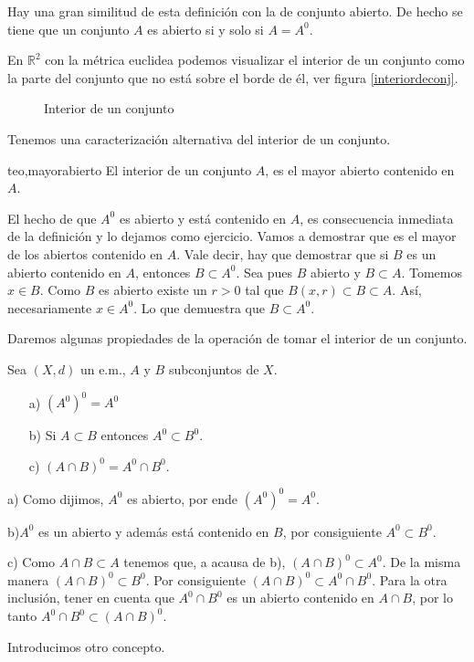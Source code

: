 Hay una gran similitud de esta definición con la de conjunto
abierto. De hecho se tiene que un conjunto $A$ es abierto si y
solo si $A=A^0$.

En $\mathbb{R}^2$ con la métrica euclidea podemos visualizar el
interior de un conjunto como la parte del conjunto que no está
sobre el borde de él, ver figura \vref{interiordeconj}.

\begin{figure}
\begin{center}
	\caption{Interior de un conjunto}\label{interiordeconj}
\end{center}
\end{figure}

Tenemos una caracterización alternativa del interior de un
conjunto.

\begin{teorema}{teo,mayorabierto} El interior de un conjunto $A$, es el mayor abierto
contenido en $A$.
\end{teorema}
\begin{demo} El hecho de que $A^0$ es abierto y está contenido
en $A$, es consecuencia inmediata de la definición y lo dejamos
como ejercicio. Vamos a demostrar que es el mayor de los abiertos
contenido en $A$. Vale decir, hay que demostrar que si $B$ es un
abierto contenido en $A$, entonces $B\subset A^0$. Sea pues $B$
abierto y $B\subset A$. Tomemos $x\in B$. Como $B$ es abierto
existe un $r>0$ tal que $B(x,r)\subset B\subset A$. Así,
necesariamente $x\in A^0$. Lo que demuestra que $B\subset A^0$.
\end{demo}

Daremos algunas propiedades de la operación de tomar el interior
de un conjunto.
\begin{teorema}{} Sea $(X,d)$ un e.m., $A$ y $B$ subconjuntos de
$X$.
\begin{itemize}
\item[a)] $(A^0)^0=A^0$
\item[b)] Si $A\subset B$ entonces $A^0\subset B^0$.
\item[c)] $(A\cap B)^0=A^0\cap B^0$.
\end{itemize}
\end{teorema}
\begin{demo} a) Como dijimos, $A^0$ es abierto, por ende
$(A^0)^0=A^0$.

b)$A^0$ es un abierto y además está contenido en $B$, por
consiguiente $A^0\subset B^0$.

c) Como $A\cap B\subset A$ tenemos que, a acausa de b), $(A\cap
B)^0\subset A^0$. De la misma manera $(A\cap B)^0\subset B^0$. Por
consiguiente $(A\cap B)^0\subset A^0\cap B^0$. Para la otra
inclusión, tener en cuenta que $A^0\cap B^0$ es un abierto
contenido en $A\cap B$, por lo tanto $A^0\cap B^0\subset (A\cap
B)^0$.
\end{demo}
 Introducimos otro concepto.

